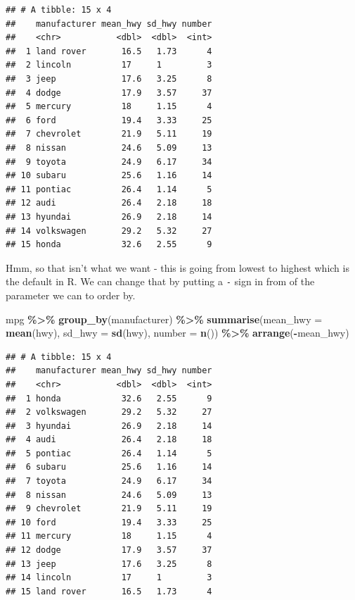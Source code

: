 \documentclass[
]{book}
\newenvironment{Shaded}{\begin{snugshade}}{\end{snugshade}}
\newcommand{\AttributeTok}[1]{\textcolor[rgb]{0.13,0.29,0.53}{#1}}
\newcommand{\FunctionTok}[1]{\textcolor[rgb]{0.13,0.29,0.53}{\textbf{#1}}}
\newcommand{\NormalTok}[1]{#1}
\newcommand{\SpecialCharTok}[1]{\textcolor[rgb]{0.81,0.36,0.00}{\textbf{#1}}}
\begin{document}
\begin{verbatim}
## # A tibble: 15 x 4
##    manufacturer mean_hwy sd_hwy number
##    <chr>           <dbl>  <dbl>  <int>
##  1 land rover       16.5   1.73      4
##  2 lincoln          17     1         3
##  3 jeep             17.6   3.25      8
##  4 dodge            17.9   3.57     37
##  5 mercury          18     1.15      4
##  6 ford             19.4   3.33     25
##  7 chevrolet        21.9   5.11     19
##  8 nissan           24.6   5.09     13
##  9 toyota           24.9   6.17     34
## 10 subaru           25.6   1.16     14
## 11 pontiac          26.4   1.14      5
## 12 audi             26.4   2.18     18
## 13 hyundai          26.9   2.18     14
## 14 volkswagen       29.2   5.32     27
## 15 honda            32.6   2.55      9
\end{verbatim}

Hmm, so that isn't what we want - this is going from lowest to highest which is the default in R. We can change that by putting a \texttt{-} sign in from of the parameter we can to order by.

\begin{Shaded}
\begin{Highlighting}[]
\NormalTok{mpg }\SpecialCharTok{\%\textgreater{}\%}
  \FunctionTok{group\_by}\NormalTok{(manufacturer) }\SpecialCharTok{\%\textgreater{}\%}
  \FunctionTok{summarise}\NormalTok{(}\AttributeTok{mean\_hwy =} \FunctionTok{mean}\NormalTok{(hwy), }\AttributeTok{sd\_hwy =} \FunctionTok{sd}\NormalTok{(hwy), }\AttributeTok{number =} \FunctionTok{n}\NormalTok{()) }\SpecialCharTok{\%\textgreater{}\%}
  \FunctionTok{arrange}\NormalTok{(}\SpecialCharTok{{-}}\NormalTok{mean\_hwy)}
\end{Highlighting}
\end{Shaded}

\begin{verbatim}
## # A tibble: 15 x 4
##    manufacturer mean_hwy sd_hwy number
##    <chr>           <dbl>  <dbl>  <int>
##  1 honda            32.6   2.55      9
##  2 volkswagen       29.2   5.32     27
##  3 hyundai          26.9   2.18     14
##  4 audi             26.4   2.18     18
##  5 pontiac          26.4   1.14      5
##  6 subaru           25.6   1.16     14
##  7 toyota           24.9   6.17     34
##  8 nissan           24.6   5.09     13
##  9 chevrolet        21.9   5.11     19
## 10 ford             19.4   3.33     25
## 11 mercury          18     1.15      4
## 12 dodge            17.9   3.57     37
## 13 jeep             17.6   3.25      8
## 14 lincoln          17     1         3
## 15 land rover       16.5   1.73      4
\end{verbatim}
\end{document}

